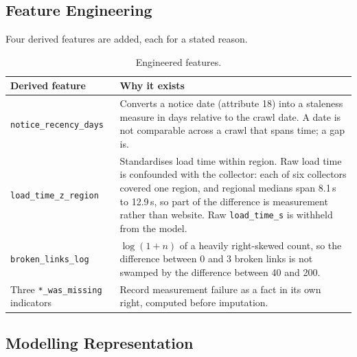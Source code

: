 \documentclass[11pt,a4paper]{article}
\begin{document}
\begin{table}[H]\centering\small
\caption{Feature blocks. \emph{Dimensions} names the scoring dimensions of
Section~\ref{sec:label} that draw on each block.}

\end{table}

\begin{table}[H]\centering\small
\caption{Features by measurement type. The dataset is dominated by binary presence flags, which is
why Euclidean distance, and therefore $k$-NN, performs poorly on it (Section~\ref{sec:results}).}

\end{table}

\subsection{Feature Engineering}
\label{sec:engineering}

Four derived features are added, each for a stated reason.

\begin{table}[H]\centering\small
\caption{Engineered features.}
\begin{tabular}{p{3.5cm}p{11.3cm}}
\toprule
\textbf{Derived feature} & \textbf{Why it exists} \\
\midrule
\texttt{notice\_recency\_days} & Converts a notice date (attribute 18) into a staleness measure in
days relative to the crawl date. A date is not comparable across a crawl that spans time; a gap is. \\
\texttt{load\_time\_z\_region} & Standardises load time within region. Raw load time is confounded
with the collector: each of six collectors covered one region, and regional medians span 8.1\,s to
12.9\,s, so part of the difference is measurement rather than website. Raw \texttt{load\_time\_s} is
withheld from the model. \\
\texttt{broken\_links\_log} & $\log(1+n)$ of a heavily right-skewed count, so the difference between
0 and 3 broken links is not swamped by the difference between 40 and 200. \\
Three \texttt{*\_was\_missing} indicators & Record measurement failure as a fact in its own right,
computed before imputation. \\
\bottomrule
\end{tabular}
\end{table}

\subsection{Modelling Representation}
\end{document}
